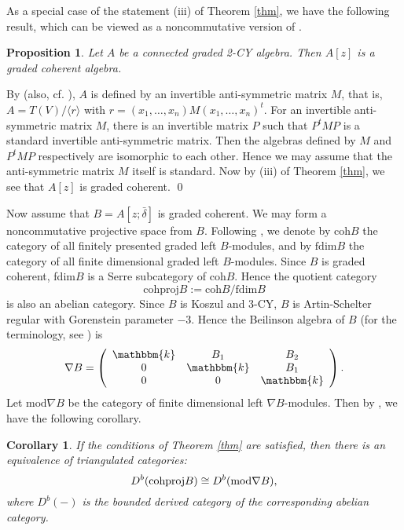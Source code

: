\documentclass[a4paper]{amsart}
\newtheorem{cor}[thm]{Corollary}
\newtheorem{prop}[thm]{Proposition}
\begin{document}
As a special case of the statement (iii) of Theorem \ref{thm}, we have the following result, which can be viewed as a noncommutative version of \cite[Theorem 4.3]{GV}.

\begin{prop}\label{prop4} Let $A$ be a connected graded 2-CY algebra. Then $A[z]$ is a graded coherent algebra.
\end{prop}
\proof By \cite[Theorem 0.1]{Z} (also, cf. \cite[Proposition 3.4]{Ber}), $A$ is defined by an invertible anti-symmetric matrix $M$, that is, $A=T(V)/\langle r\rangle$ with $r=(x_1,\dots,x_n)M(x_1,\dots,x_n)^t$. For an invertible anti-symmetric matrix $M$, there is an invertible matrix $P$ such that $P^tMP$ is a standard invertible anti-symmetric matrix. Then the algebras defined by $M$ and $P^tMP$ respectively are isomorphic to each other. Hence we may assume that the anti-symmetric matrix $M$ itself is standard. Now by (iii) of Theorem \ref{thm}, we see that $A[z]$ is graded coherent. \qed

Now assume that $B=A[z;\bar{\delta}]$ is graded coherent. We may form a noncommutative projective space from $B$. Following \cite{Po}, we denote by $\text{coh}B$ the category of all finitely presented graded left $B$-modules, and by $\text{fdim}B$ the category of all finite dimensional graded left $B$-modules. Since $B$ is graded coherent, fdim$B$ is a Serre subcategory of coh$B$. Hence the quotient category $$\text{cohproj}B:=\text{coh}B/\text{fdim}B$$ is also an abelian category. Since $B$ is Koszul and 3-CY, $B$ is Artin-Schelter regular with Gorenstein parameter $-3$. Hence the Beilinson algebra of $B$ (for the terminology, see \cite[Definition 4.7]{MM}) is $$\nabla B=\left(
                          \begin{array}{ccc}
                            {\mathbbm{k}} & B_1 & B_2 \\
                            0 & {\mathbbm{k}} & B_1 \\
                            0 & 0 & {\mathbbm{k}} \\
                          \end{array}
                        \right).
$$ Let $\text{mod}\nabla B$ be the category of finite dimensional left $\nabla B$-modules. Then by \cite[Theorem 4.14]{MM}, we have the following corollary.

\begin{cor} If the conditions of Theorem \ref{thm} are satisfied, then there is an equivalence of triangulated categories: $$D^b(\text{\rm cohproj}B)\cong D^b(\text{\rm mod}\nabla B),$$ where $D^b(-)$ is the bounded derived category of the corresponding abelian category.
\end{cor}
\end{document}
